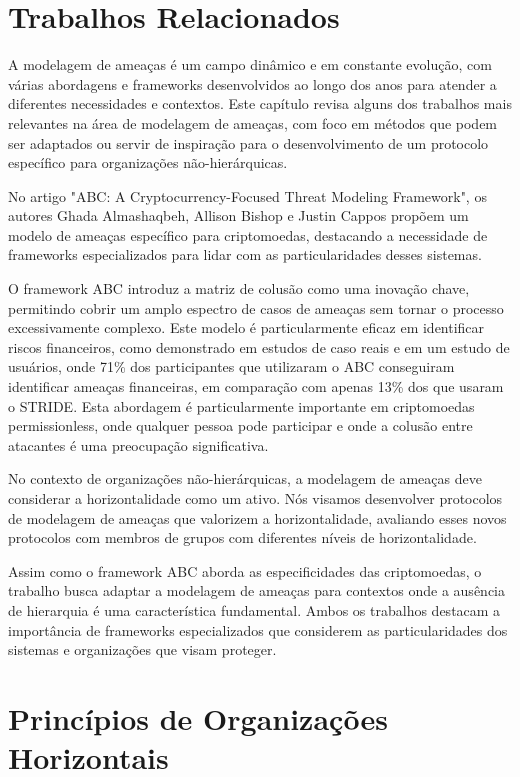 \section{Trabalhos Relacionados}
\label{sec:related}

A modelagem de ameaças é um campo dinâmico e em constante evolução, com várias
abordagens e frameworks desenvolvidos ao longo dos anos para atender a diferentes
necessidades e contextos. Este capítulo revisa alguns dos trabalhos mais relevantes na área
de modelagem de ameaças, com foco em métodos que podem ser adaptados ou servir de
inspiração para o desenvolvimento de um protocolo específico para organizações
não-hierárquicas. 

No artigo "ABC: A Cryptocurrency-Focused Threat Modeling Framework", os autores
Ghada Almashaqbeh, Allison Bishop e Justin Cappos propõem um modelo de ameaças
específico para criptomoedas, destacando a necessidade de frameworks especializados
para lidar com as particularidades desses sistemas. 

O framework ABC introduz a matriz de colusão como uma inovação chave,
permitindo cobrir um amplo espectro de casos de ameaças sem tornar o processo
excessivamente complexo. Este modelo é particularmente eficaz em identificar riscos
financeiros, como demonstrado em estudos de caso reais e em um estudo de usuários, onde
71\% dos participantes que utilizaram o ABC conseguiram identificar ameaças
financeiras, em comparação com apenas 13\% dos que usaram o STRIDE. Esta abordagem é
particularmente importante em criptomoedas permissionless, onde qualquer pessoa pode
participar e onde a colusão entre atacantes é uma preocupação significativa. 

No contexto de organizações não-hierárquicas, a modelagem de ameaças deve considerar
a horizontalidade como um ativo. Nós visamos desenvolver protocolos de modelagem de ameaças que
valorizem a horizontalidade, avaliando esses novos protocolos com membros de grupos
com diferentes níveis de horizontalidade. 

Assim como o framework ABC aborda as especificidades das criptomoedas, o
trabalho busca adaptar a modelagem de ameaças para contextos onde a
ausência de hierarquia é uma característica fundamental. Ambos os trabalhos
destacam a importância de frameworks especializados que considerem as
particularidades dos sistemas e organizações que visam proteger.

\section{Princípios de Organizações Horizontais}
\label{sec:introduction}


